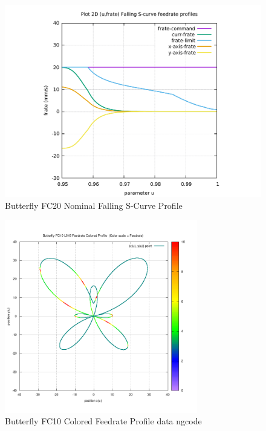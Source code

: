 \begin{figure}
	\caption     {Butterfly FC20 Nominal Falling S-Curve Profile}
	\label{16-img-Butterfly-FC20-Nominal-Falling-S-Curve-Profile.pdf}
	\includegraphics[width=1.00\textwidth]{Chap4/appendix/app-Butterfly/plots/16-img-Butterfly-FC20-Nominal-Falling-S-Curve-Profile.pdf}
\end{figure}

\clearpage
\pagebreak

\begin{figure}
	\caption     {Butterfly FC10 Colored Feedrate Profile data ngcode}
	\label{17-img-Butterfly-FC10-Colored-Feedrate-Profile-data_ngcode.png}
	\includegraphics[width=0.75\textwidth]{Chap4/appendix/app-Butterfly/plots/17-img-Butterfly-FC10-Colored-Feedrate-Profile-data_ngcode.png}
\end{figure}


